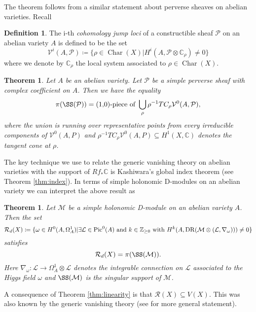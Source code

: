 \documentclass[12pt,reqno]{amsart}
\newtheorem{alphtheorem}{Theorem}
\newtheorem{alphtheoremprime}{Theorem}
\theoremstyle{question}
\theoremstyle{definition}
\newtheorem{definition}[theorem]{Definition}
\theoremstyle{remark}
\theoremstyle{cited}
\theoremstyle{citeddef}
\DeclareMathOperator{\Char}{Char}
\def\Pic{{\rm Pic}}
\newcommand{\sL}{\mathcal{L}}
\newcommand{\sM}{\mathcal{M}}
\newcommand{\sP}{\mathcal{P}}
\newcommand{\sR}{\mathcal{R}}
\newcommand\sV{{\mathcal V}}
\newcommand{\bbC}{\mathbb{C}}
\newcommand{\bbZ}{\mathbb{Z}}
\DeclareMathOperator{\dr}{DR}
\begin{document}
The theorem follows from a similar statement
about perverse sheaves on abelian varieties. Recall
\begin{definition}
The i-th\textsl{ cohomology jump loci} of a constructible sheaf $\sP$ on an abelian variety $A$ is defined to be the set
\[\sV^i(A, \sP) \coloneqq \{\rho\in\Char(X)| H^i(A, \sP\otimes \bbC_{\rho}) \neq 0\}\]
where we denote by $\bbC_{\rho}$ the local system associated to $\rho\in \Char(X)$.
\label{def:cjl}
\end{definition}
\begin{alphtheorem}
Let $A$ be an abelian variety. Let $\sP$ be a simple perverse sheaf with complex coefficient on $A$. 
Then we have the equality
$$\pi(\SS(\sP)) = \text{(1,0)-piece of }\bigcup_{\rho} \rho^{-1} TC_{\rho} \sV^0(A,\sP), $$
where the union is running over representative points from every irreducible components of $\sV^0(A,P)$ and
$\rho^{-1}TC_{\rho} \sV^0(A,P) \subseteq H^1(X, \bbC)$ denotes the tangent cone at $\rho$. 
\label{thm:perverse}
\end{alphtheorem}

The key technique we
use to relate the generic vanishing theory on abelian varieties with the support of $Rf_*\bbC$ is Kashiwara's
global index theorem (see Theorem \ref{thm:index}). In terms of simple holonomic D-modules
on an abelian variety we can interpret the above result as

\setcounter{alphtheoremprime}{3}
\begin{alphtheoremprime}
Let $\sM$ be a simple holonomic D-module on an abelian variety $A$.
Then the set
\[\sR_d(X)\coloneqq \{\omega\in H^0(A, \Omega_A^1)|\exists \sL \in \Pic^0(A)\text{ and } k\in\bbZ_{\geq 0} \text{ with }
H^{k}(A, \dr(\sM\otimes(\sL, \nabla_{\omega}))) \neq 0\}\]
satisfies
\[\sR_d(X) = \pi(\SS(\sM)).\]
Here $\nabla_{\omega}\colon \sL \to \Omega_A^1\otimes \sL$
denotes the integrable connection on $\sL$ associated to the Higgs
field $\omega$ and $\SS(\sM)$ is the singular support of $\sM$.
\label{thm:dlinearity}
\end{alphtheoremprime}
A consequence of Theorem \ref{thm:linearity} is that $\sR(X)\subseteq V(X)$. This was also known by the generic vanishing theory
(see \cite{BWY} for more general statement). 
\end{document}
